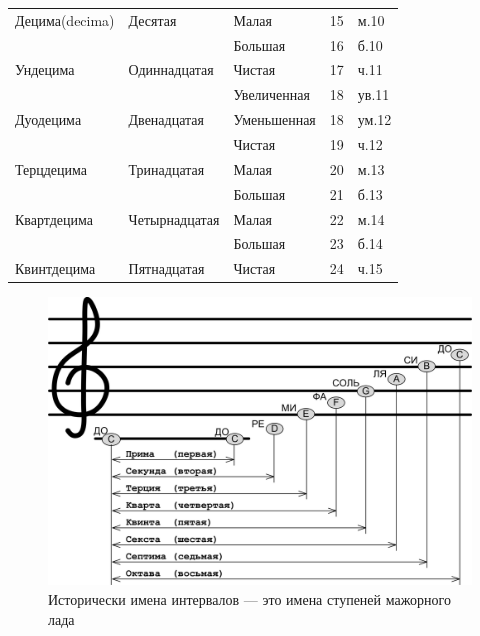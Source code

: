 \begin{table}[!ht]
\begin{tabular}{l|l|l|c|l}
        Децима(decima)     & Десятая            & Малая         & 15                & м.10 \\
                           &                    & Большая       & 16                & б.10 \\
        Ундецима           & Одиннадцатая       & Чистая        & 17                & ч.11 \\
                           &                    & Увеличенная   & 18                & ув.11\\
        Дуодецима          & Двенадцатая        & Уменьшенная   & 18                & ум.12\\
                           &                    & Чистая        & 19                & ч.12 \\
        Терцдецима         & Тринадцатая        & Малая         & 20                & м.13 \\
                           &                    & Большая       & 21                & б.13 \\
        Квартдецима        & Четырнадцатая      & Малая         & 22                & м.14 \\
                           &                    & Большая       & 23                & б.14 \\
        Квинтдецима        & Пятнадцатая        & Чистая        & 24                & ч.15 \\
        \hline\hline
    \end{tabular}
\end{table}

\begin{figure}[!ht]
    \centering
    \includegraphics[width=\textwidth]{fig/intervals/interval-names} 
    \caption{Исторически имена интервалов --- это имена ступеней мажорного лада}\label{fig:harmony:interval:names}
\end{figure} 

